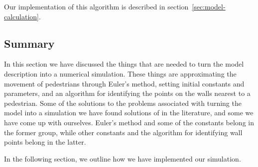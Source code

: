 Our implementation of this algorithm is described in 
section~\ref{sec:model-calculation}.

\subsection{Summary}
In this section we have discussed the things that are needed to turn the model 
description into a numerical simulation. These things are approximating the 
movement of pedestrians through Euler's method, setting initial constants and 
parameters, and an algorithm for identifying the points on the walls nearest 
to a pedestrian. Some of the solutions to the problems associated with turning 
the model into a simulation we have found solutions of in the literature, and 
some we have come up with ourselves. Euler's method and some of the constants 
belong in the former group, while other constants and the algorithm for 
identifying wall points belong in the latter.

In the following section, we outline how we have implemented our simulation.
